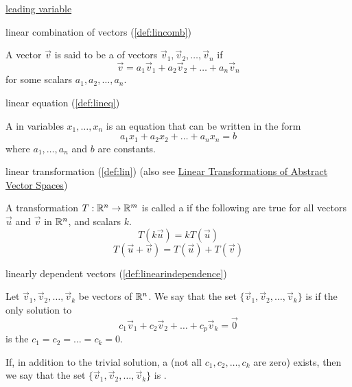 \documentclass{ximera}
\begin{document}
\href{https://ximera.osu.edu/oerlinalg/LinearAlgebra/SYS-0020/main}{leading variable}



linear combination of vectors (\ref{def:lincomb})
\begin{expandable}
    A vector $\vec{v}$ is said to be a  of vectors $\vec{v}_1, \vec{v}_2,\ldots, \vec{v}_n$ if 
$$\vec{v}=a_1\vec{v}_1+ a_2\vec{v}_2+\ldots + a_n\vec{v}_n$$
for some scalars $a_1, a_2, \ldots ,a_n$.
\end{expandable}


linear equation (\ref{def:lineq})
\begin{expandable}
    A  in variables $x_1, \ldots, x_n$ is an equation that can be written in the form
$$a_1x_1+a_2x_2+\ldots +a_nx_n=b$$
where $a_1,\ldots ,a_n$ and $b$ are constants.
\end{expandable}

linear transformation (\ref{def:lin}) (also see \href{https://ximera.osu.edu/oerlinalg/LinearAlgebra/LTR-0022/main}{Linear Transformations of Abstract Vector Spaces})
\begin{expandable}
    A transformation $T:\mathbb{R}^n\rightarrow \mathbb{R}^m$ is called a  if the following are true for all vectors $\vec{u}$ and $\vec{v}$ in $\mathbb{R}^n$, and scalars $k$.
\begin{equation}
T(k\vec{u})= kT(\vec{u})
\end{equation}
\begin{equation}
T(\vec{u}+\vec{v})= T(\vec{u})+T(\vec{v})
\end{equation}
\end{expandable}

linearly dependent vectors (\ref{def:linearindependence})
\begin{expandable}
    Let $\vec{v}_1, \vec{v}_2,\ldots ,\vec{v}_k$ be vectors of $\mathbb{R}^n$.  We say that the set $\{\vec{v}_1, \vec{v}_2,\ldots ,\vec{v}_k\}$ is  if the only solution to 
\begin{equation}c_1\vec{v}_1+c_2\vec{v}_2+\ldots +c_p\vec{v}_k=\vec{0}\end{equation}
is the  $c_1=c_2=\ldots =c_k=0$.

If, in addition to the trivial solution, a  (not all $c_1, c_2,\ldots ,c_k$ are zero) exists, then we say that the set $\{\vec{v}_1, \vec{v}_2,\ldots ,\vec{v}_k\}$ is .
\end{expandable}
\end{document}
